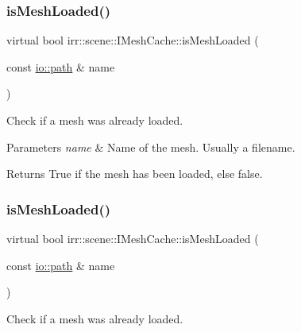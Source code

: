 \subsubsection{\texorpdfstring{is\+Mesh\+Loaded()}{isMeshLoaded()}\hspace{0.1cm}{\footnotesize\ttfamily [1/2]}}
{\footnotesize\ttfamily virtual bool irr\+::scene\+::\+I\+Mesh\+Cache\+::is\+Mesh\+Loaded (\begin{DoxyParamCaption}\item[{const \hyperlink{namespaceirr_1_1io_a6468281622ce3a1c46b72e19f32dded5}{io\+::path} \&}]{name }\end{DoxyParamCaption})\hspace{0.3cm}{\ttfamily [pure virtual]}}



Check if a mesh was already loaded. 


\begin{DoxyParams}{Parameters}
{\em name} & Name of the mesh. Usually a filename. \\
\hline
\end{DoxyParams}
\begin{DoxyReturn}{Returns}
True if the mesh has been loaded, else false. 
\end{DoxyReturn}
\mbox{\label{classirr_1_1scene_1_1IMeshCache_a42a13fab5b76ab7142a1d47dac80548b}} 
\subsubsection{\texorpdfstring{is\+Mesh\+Loaded()}{isMeshLoaded()}\hspace{0.1cm}{\footnotesize\ttfamily [2/2]}}
{\footnotesize\ttfamily virtual bool irr\+::scene\+::\+I\+Mesh\+Cache\+::is\+Mesh\+Loaded (\begin{DoxyParamCaption}\item[{const \hyperlink{namespaceirr_1_1io_a6468281622ce3a1c46b72e19f32dded5}{io\+::path} \&}]{name }\end{DoxyParamCaption})\hspace{0.3cm}{\ttfamily [pure virtual]}}



Check if a mesh was already loaded. 



